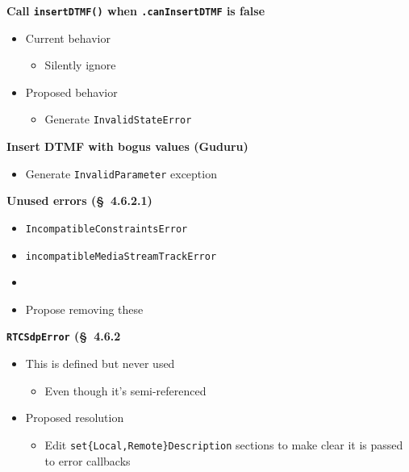 \documentclass[helvetica]{seminar}
\newcommand{\heading}[1]{%
  \begin{center} 
    \large\bf 
    #1 
  \end{center} 
  \vspace{.4 in}}
\begin{document}
\begin{slide}
\heading{Call \texttt{insertDTMF()} when \texttt{.canInsertDTMF} is false}

\begin{itemize}
\item Current behavior
  \begin{itemize}
  \item Silently ignore
  \end{itemize}

\item Proposed behavior
  \begin{itemize}
  \item Generate \verb^InvalidStateError^
  \end{itemize}
\end{itemize}
\end{slide}


\begin{slide}
\heading{Insert DTMF with bogus values (Guduru)}

\begin{itemize}
\item Generate \verb^InvalidParameter^ exception
\end{itemize}

\end{slide}

\begin{slide}
\heading{Unused errors (\S\  4.6.2.1)}

\begin{itemize}
\item \verb^IncompatibleConstraintsError^
\item \verb^incompatibleMediaStreamTrackError^
\item
\item Propose removing these
\end{itemize}
\end{slide}


\begin{slide}
\heading{\texttt{RTCSdpError} (\S\ 4.6.2}

\begin{itemize}
\item This is defined but never used
  \begin{itemize}
  \item Even though it's semi-referenced
  \end{itemize}

\item Proposed resolution
  \begin{itemize}
  \item Edit \verb^set{Local,Remote}Description^ sections to make clear it is passed to error callbacks
  \end{itemize}
\end{itemize}
\end{slide}
\end{document}
